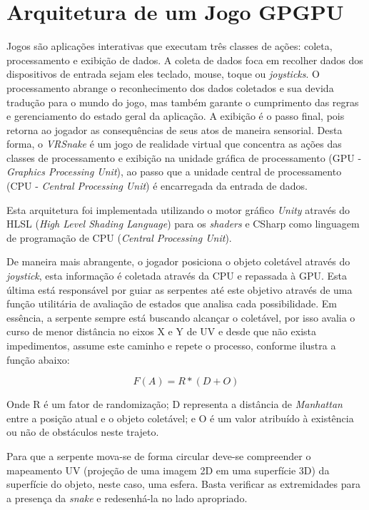\documentclass[conference]{IEEEtran}
\begin{document}
\section{Arquitetura de um Jogo GPGPU} \label{sec:architecture}
Jogos são aplicações interativas que executam três classes de ações: coleta, processamento e exibição de dados. %
A coleta de dados foca em recolher dados dos dispositivos de entrada sejam eles teclado, mouse, toque ou \textit{joysticks}. O processamento abrange o reconhecimento dos dados coletados e sua devida tradução para o mundo do jogo, mas também garante o cumprimento das regras e gerenciamento do estado geral da aplicação. A exibição é o passo final, pois retorna ao jogador as consequências de seus atos de maneira sensorial. Desta forma, o \textit{VRSnake} é um jogo de realidade virtual que concentra as ações das classes de processamento e exibição na unidade gráfica de processamento (GPU - \textit{Graphics Processing Unit}), ao passo que a unidade central de processamento (CPU - \textit{Central Processing Unit}) é encarregada da entrada de dados.

Esta arquitetura foi implementada utilizando o motor gráfico \textit{Unity} através do HLSL (\textit{High Level Shading Language}) para os \textit{shaders} e CSharp como linguagem de programação de CPU (\textit{Central Processing Unit}).

De maneira mais abrangente, o jogador posiciona o objeto coletável através do \textit{joystick}, esta informação é coletada através da CPU e repassada à GPU. Esta última está responsável por guiar as serpentes até este objetivo através de uma função utilitária de avaliação de estados que analisa cada possibilidade. Em essência, a serpente sempre está buscando alcançar o coletável, por isso avalia o curso de menor distância no eixos X e Y de UV e desde que não exista impedimentos, assume este caminho e repete o processo, conforme ilustra a função abaixo:

\begin{equation}
F(A) = R * (D + O)
\label{equation11}
\end{equation}

Onde R é um fator de randomização; D representa a distância de \textit{Manhattan} entre a posição atual e o objeto coletável; e O é um valor atribuído à existência ou não de obstáculos neste trajeto.

Para que a serpente mova-se de forma circular deve-se compreender o mapeamento UV (projeção de uma imagem 2D em uma superfície 3D) da superfície do objeto, neste caso, uma esfera. Basta verificar as extremidades para a presença da \textit{snake} e redesenhá-la no lado apropriado.
\end{document}

